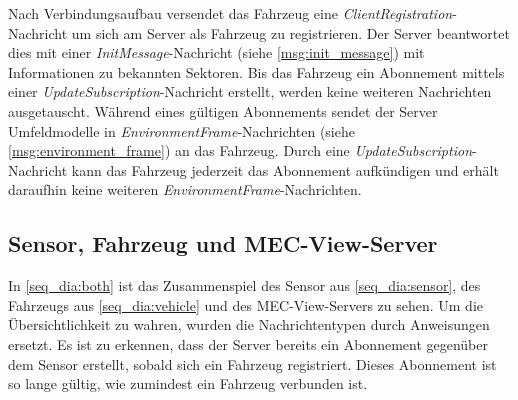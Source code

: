Nach Verbindungsaufbau versendet das Fahrzeug eine \textit{ClientRegistration}-Nachricht um sich am Server als Fahrzeug zu registrieren.
Der Server beantwortet dies mit einer \textit{InitMessage}-Nachricht (siehe \autoref{msg:init_message}) mit Informationen zu bekannten Sektoren.
Bis das Fahrzeug ein Abonnement mittels einer \textit{UpdateSubscription}-Nachricht erstellt, werden keine weiteren Nachrichten ausgetauscht.
Während eines gültigen Abonnements sendet der Server Umfeldmodelle in \textit{EnvironmentFrame}-Nachrichten (siehe \autoref{msg:environment_frame}) an das Fahrzeug.
Durch eine \textit{UpdateSubscription}-Nachricht kann das Fahrzeug jederzeit das Abonnement aufkündigen und erhält daraufhin keine weiteren \textit{EnvironmentFrame}-Nachrichten.

\subsection{Sensor, Fahrzeug und MEC-View-Server}

In \autoref{seq_dia:both} ist das Zusammenspiel des Sensor aus \autoref{seq_dia:sensor}, des Fahrzeugs aus \autoref{seq_dia:vehicle} und des MEC-View-Servers zu sehen.
Um die Übersichtlichkeit zu wahren, wurden die Nachrichtentypen durch Anweisungen ersetzt.
Es ist zu erkennen, dass der Server bereits ein Abonnement gegenüber dem Sensor erstellt, sobald sich ein Fahrzeug registriert.
Dieses Abonnement ist so lange gültig, wie zumindest ein Fahrzeug verbunden ist.

\vspace*{\fill}
\null


